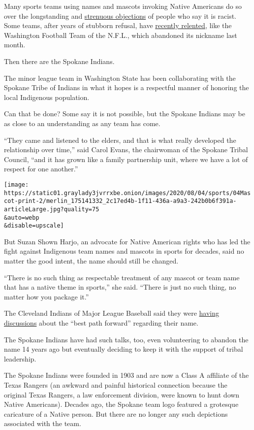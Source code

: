 Many sports teams using names and mascots invoking Native Americans do
so over the longstanding and
\href{https://www.nytimes3xbfgragh.onion/2020/07/10/sports/football/washington-redskins-name-change-mascots.html}{strenuous
objections} of people who say it is racist. Some teams, after years of
stubborn refusal, have
\href{https://www.nytimes3xbfgragh.onion/2020/07/23/sports/football/washington-football-team-name-logo.html}{recently
relented}, like the Washington Football Team of the N.F.L., which
abandoned its nickname last month.

Then there are the Spokane Indians.

The minor league team in Washington State has been collaborating with
the Spokane Tribe of Indians in what it hopes is a respectful manner of
honoring the local Indigenous population.

Can that be done? Some say it is not possible, but the Spokane Indians
may be as close to an understanding as any team has come.

``They came and listened to the elders, and that is what really
developed the relationship over time,'' said Carol Evans, the chairwoman
of the Spokane Tribal Council, ``and it has grown like a family
partnership unit, where we have a lot of respect for one another.''

\texttt{[image: https://static01.graylady3jvrrxbe.onion/images/2020/08/04/sports/04Mascot-print-2/merlin\_175141332\_2c17ed4b-1f11-436a-a9a3-242b0b6f391a-articleLarge.jpg?quality=75\\\&auto=webp\\\&disable=upscale]}

But Suzan Shown Harjo, an advocate for Native American rights who has
led the fight against Indigenous team names and mascots in sports for
decades, said no matter the good intent, the name should still be
changed.

``There is no such thing as respectable treatment of any mascot or team
name that has a native theme in sports,'' she said. ``There is just no
such thing, no matter how you package it.''

The Cleveland Indians of Major League Baseball said they were
\href{https://www.nytimes3xbfgragh.onion/2020/07/03/sports/baseball/cleveland-indians-name-change.html}{having
discussions} about the ``best path forward'' regarding their name.

The Spokane Indians have had such talks, too, even volunteering to
abandon the name 14 years ago but eventually deciding to keep it with
the support of tribal leadership.

The Spokane Indians were founded in 1903 and are now a Class A affiliate
of the Texas Rangers (an awkward and painful historical connection
because the original Texas Rangers, a law enforcement division, were
known to hunt down Native Americans). Decades ago, the Spokane team logo
featured a grotesque caricature of a Native person. But there are no
longer any such depictions associated with the team.

